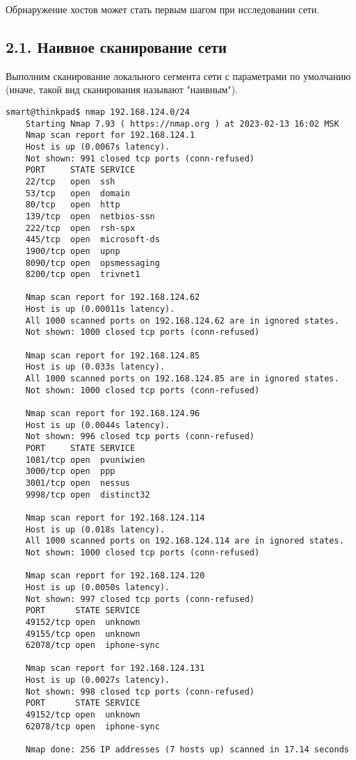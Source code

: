 Обрнаружение хостов может стать первым шагом при исследовании сети.

\subsection*{2.1. Наивное сканирование сети}

Выполним сканирование локального сегмента сети с параметрами по умолчанию (иначе, такой вид сканирования называют "наивным").

\begin{Verbatim}[frame=single,breaklines=true,breakanywhere=true]
    smart@thinkpad$ nmap 192.168.124.0/24
    Starting Nmap 7.93 ( https://nmap.org ) at 2023-02-13 16:02 MSK
    Nmap scan report for 192.168.124.1
    Host is up (0.0067s latency).
    Not shown: 991 closed tcp ports (conn-refused)
    PORT     STATE SERVICE
    22/tcp   open  ssh
    53/tcp   open  domain
    80/tcp   open  http
    139/tcp  open  netbios-ssn
    222/tcp  open  rsh-spx
    445/tcp  open  microsoft-ds
    1900/tcp open  upnp
    8090/tcp open  opsmessaging
    8200/tcp open  trivnet1

    Nmap scan report for 192.168.124.62
    Host is up (0.00011s latency).
    All 1000 scanned ports on 192.168.124.62 are in ignored states.
    Not shown: 1000 closed tcp ports (conn-refused)

    Nmap scan report for 192.168.124.85
    Host is up (0.033s latency).
    All 1000 scanned ports on 192.168.124.85 are in ignored states.
    Not shown: 1000 closed tcp ports (conn-refused)

    Nmap scan report for 192.168.124.96
    Host is up (0.0044s latency).
    Not shown: 996 closed tcp ports (conn-refused)
    PORT     STATE SERVICE
    1081/tcp open  pvuniwien
    3000/tcp open  ppp
    3001/tcp open  nessus
    9998/tcp open  distinct32

    Nmap scan report for 192.168.124.114
    Host is up (0.018s latency).
    All 1000 scanned ports on 192.168.124.114 are in ignored states.
    Not shown: 1000 closed tcp ports (conn-refused)

    Nmap scan report for 192.168.124.120
    Host is up (0.0050s latency).
    Not shown: 997 closed tcp ports (conn-refused)
    PORT      STATE SERVICE
    49152/tcp open  unknown
    49155/tcp open  unknown
    62078/tcp open  iphone-sync

    Nmap scan report for 192.168.124.131
    Host is up (0.0027s latency).
    Not shown: 998 closed tcp ports (conn-refused)
    PORT      STATE SERVICE
    49152/tcp open  unknown
    62078/tcp open  iphone-sync

    Nmap done: 256 IP addresses (7 hosts up) scanned in 17.14 seconds
\end{Verbatim}

